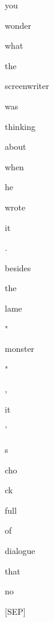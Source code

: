 \documentclass[varwidth=150mm]{standalone}
\begin{document}
\begin{CJK*}{UTF8}{gbsn}
{{{\colorbox{red!1.2890468835830688}{\strut you} \colorbox{red!0.0}{\strut wonder} \colorbox{red!0.0}{\strut what} \colorbox{red!2.048609495162964}{\strut the} \colorbox{red!12.09138298034668}{\strut screenwriter} \colorbox{red!2.5103650093078613}{\strut was} \colorbox{red!2.429328441619873}{\strut thinking} \colorbox{red!2.688936233520508}{\strut about} \colorbox{red!0.0}{\strut when} \colorbox{red!0.0}{\strut he} \colorbox{red!3.8558313846588135}{\strut wrote} \colorbox{red!4.345329761505127}{\strut it} \colorbox{red!0.0}{\strut .} \colorbox{red!2.779125928878784}{\strut besides} \colorbox{red!1.8436459302902222}{\strut the} \colorbox{red!2.835310220718384}{\strut lame} \colorbox{red!1.5798609256744385}{\strut "} \colorbox{red!6.715870380401611}{\strut monster} \colorbox{red!6.96068000793457}{\strut "} \colorbox{red!1.7686363458633423}{\strut ,} \colorbox{red!12.951289176940918}{\strut it} \colorbox{red!5.929482936859131}{\strut '} \colorbox{red!18.6246337890625}{\strut s} \colorbox{red!1.1269079446792603}{\strut cho}\colorbox{red!3.3010435104370117}{\strut ck} \colorbox{red!1.483044147491455}{\strut full} \colorbox{red!1.599082589149475}{\strut of} \colorbox{red!8.476112365722656}{\strut dialogue} \colorbox{red!7.690918445587158}{\strut that} \colorbox{red!6.548954963684082}{\strut no} \colorbox{red!2.5718586444854736}{\strut [SEP]}
}}}
\end{CJK*}
\end{document}
